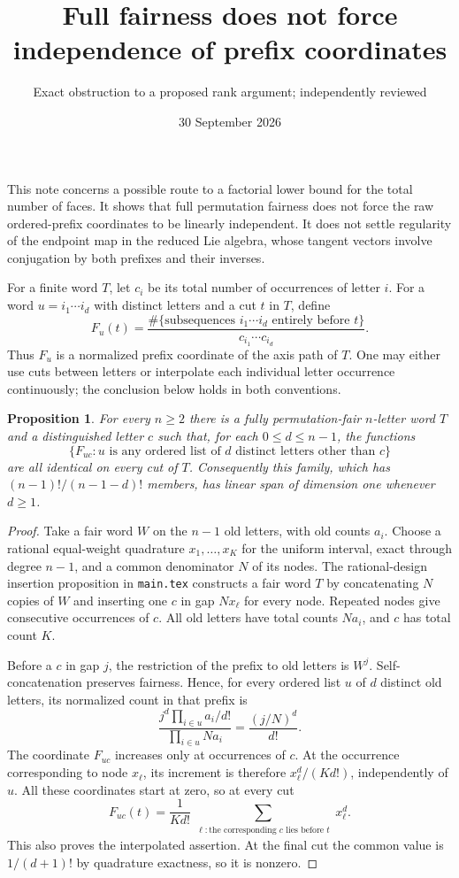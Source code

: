 \documentclass[11pt]{article}
\title{Full fairness does not force independence of prefix coordinates}
\author{Exact obstruction to a proposed rank argument; independently reviewed}
\date{30 September 2026}
\newtheorem{proposition}{Proposition}
\begin{document}
\maketitle
This note concerns a possible route to a factorial lower bound for the
total number of faces. It shows that full permutation fairness does not
force the raw ordered-prefix coordinates to be linearly independent.
It does not settle regularity of the endpoint map in the reduced Lie
algebra, whose tangent vectors involve conjugation by both prefixes and
their inverses.

For a finite word $T$, let $c_i$ be its total number of occurrences of
letter $i$. For a word $u=i_1\cdots i_d$ with distinct letters and a cut
$t$ in $T$, define
\[
 F_u(t)=\frac{\#\{\text{subsequences }i_1\cdots i_d
                    \text{ entirely before }t\}}
                  {c_{i_1}\cdots c_{i_d}}.
\]
Thus $F_u$ is a normalized prefix coordinate of the axis path of $T$.
One may either use cuts between letters or interpolate each individual
letter occurrence continuously; the conclusion below holds in both
conventions.

\begin{proposition}
For every $n\ge2$ there is a fully permutation-fair $n$-letter word $T$
and a distinguished letter $c$ such that, for each $0\le d\le n-1$,
the functions
\[
 \{F_{u c}: u\text{ is any ordered list of }d
                   \text{ distinct letters other than }c\}
\]
are all identical on every cut of $T$.
Consequently this family, which has $(n-1)!/(n-1-d)!$ members, has
linear span of dimension one whenever $d\ge1$.
\end{proposition}
\begin{proof}
Take a fair word $W$ on the $n-1$ old letters, with old counts $a_i$.
Choose a rational equal-weight quadrature $x_1,\ldots,x_K$ for the
uniform interval, exact through degree $n-1$, and a common denominator
$N$ of its nodes. The rational-design insertion proposition in
\texttt{main.tex} constructs a fair word $T$ by concatenating $N$
copies of $W$ and inserting one $c$ in gap $Nx_\ell$ for every node.
Repeated nodes give consecutive occurrences of $c$. All old letters
have total counts $Na_i$, and $c$ has total count $K$.

Before a $c$ in gap $j$, the restriction of the prefix to old letters
is $W^j$. Self-concatenation preserves fairness. Hence, for every
ordered list $u$ of $d$ distinct old letters, its normalized count in
that prefix is
\[
 \frac{j^d\prod_{i\in u}a_i/d!}{\prod_{i\in u}Na_i}
       =\frac{(j/N)^d}{d!}.
\]
The coordinate $F_{u c}$ increases only at occurrences of $c$. At the
occurrence corresponding to node $x_\ell$, its increment is therefore
$x_\ell^d/(K d!)$, independently of $u$. All these coordinates start
at zero, so at every cut
\[
 F_{u c}(t)=\frac1{K d!}
       \sum_{\substack{\ell:\text{the corresponding }c
                                  \text{ lies before }t}}x_\ell^d.
\]
This also proves the interpolated assertion. At the final cut the
common value is $1/(d+1)!$ by quadrature exactness, so it is nonzero.
\end{proof}
\end{document}
